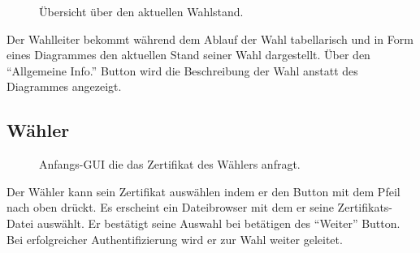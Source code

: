 \documentclass[parskip=full,11pt,twoside]{scrartcl}
\begin{document}
\begin{figure}[H]
	\caption{\label{fig:wlltr-status}
		Übersicht über den aktuellen Wahlstand.
	}
\end{figure}
Der Wahlleiter bekommt während dem Ablauf der Wahl tabellarisch und in Form eines Diagrammes den aktuellen Stand seiner Wahl dargestellt. Über den \enquote{Allgemeine Info.} Button wird die Beschreibung der Wahl anstatt des Diagrammes angezeigt.


\subsection{Wähler}

\begin{figure}[H]
	\caption{\label{fig:whlr-start}
		Anfangs-GUI die das Zertifikat des Wählers anfragt.
	}
\end{figure}
Der Wähler kann sein \gls{Zertifikat} auswählen indem er den Button mit dem Pfeil nach oben drückt. Es erscheint ein Dateibrowser mit dem er seine Zertifikats-Datei auswählt. Er bestätigt seine Auswahl bei betätigen des \enquote{Weiter} Button. Bei erfolgreicher Authentifizierung wird er zur Wahl weiter geleitet.
\end{document}
